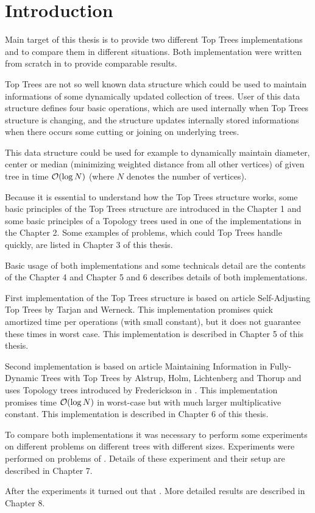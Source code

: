 \chapter*{Introduction}

Main target of this thesis is to provide two different {\I Top Trees}
implementations and to compare them in different situations. Both implementation
were written from scratch in \Cpp{} to provide comparable results.

{\I Top Trees} are not so well known data structure which could be used to
maintain informations of some dynamically updated collection of trees. User of
this data structure defines four basic operations, which are used internally
when Top Trees structure is changing, and the structure updates internally
stored informations when there occurs some cutting or joining on underlying
trees.

This data structure could be used for example to dynamically maintain diameter,
center or median (minimizing weighted distance from all other vertices) of given
tree in time ${\cal O}(\log N)$ (where $N$ denotes the number of vertices).

Because it is essential to understand how the Top Trees structure works, some
basic principles of the Top Trees structure are introduced in the Chapter 1
and some basic principles of a Topology trees used in one of the implementations
in the Chapter 2. Some examples of problems, which could Top Trees handle
quickly, are listed in Chapter 3 of this thesis.

Basic usage of both implementations and some technicals detail are the contents
of the Chapter 4 and Chapter 5 and 6 describes details of both implementations.

First implementation of the Top Trees structure is based on article {\I
Self-Adjusting Top Trees} \cite{SelfAdjustingTT} by Tarjan and Werneck. This
implementation promises quick amortized time per operations (with small
constant), but it does not guarantee these times in worst case. This
implementation is described in Chapter 5 of this thesis.

Second implementation is based on article {\I Maintaining Information in Fully-
Dynamic Trees with Top Trees} \cite{TopTrees} by Alstrup, Holm, Lichtenberg and
Thorup and uses Topology trees introduced by Frederickson in
\cite{DSforDynamicallyMaintainingRootedTrees}. This implementation promises time
${\cal O}(\log N)$ in worst-case but with much larger multiplicative constant. This
implementation is described in Chapter 6 of this thesis.

To compare both implementations it was necessary to perform some experiments on
different problems on different trees with different sizes. Experiments were
performed on problems of . Details of these experiment
and their setup are described in Chapter 7.

After the experiments it turned out that
.
More detailed results are described in Chapter 8.
